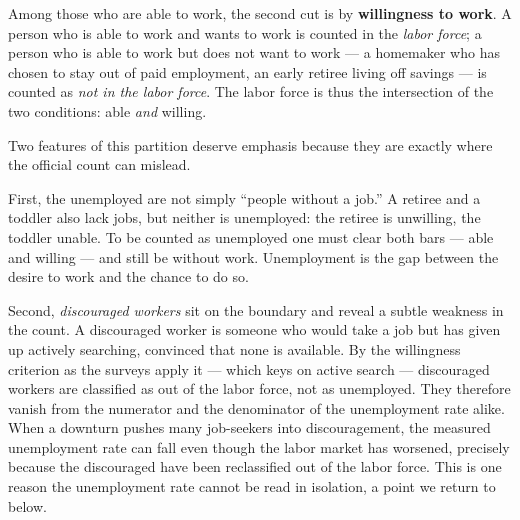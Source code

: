 Among those who are able to work, the second cut is by \textbf{willingness to work}. A person who is able to work and wants to work is counted in the \emph{labor force}; a person who is able to work but does not want to work --- a homemaker who has chosen to stay out of paid employment, an early retiree living off savings --- is counted as \emph{not in the labor force}. The labor force is thus the intersection of the two conditions: able \emph{and} willing.


Two features of this partition deserve emphasis because they are exactly where the official count can mislead.

First, the unemployed are not simply ``people without a job.'' A retiree and a toddler also lack jobs, but neither is unemployed: the retiree is unwilling, the toddler unable. To be counted as unemployed one must clear both bars --- able and willing --- and still be without work. Unemployment is the gap between the desire to work and the chance to do so.

Second, \emph{discouraged workers} sit on the boundary and reveal a subtle weakness in the count. A discouraged worker is someone who would take a job but has given up actively searching, convinced that none is available. By the willingness criterion as the surveys apply it --- which keys on active search --- discouraged workers are classified as out of the labor force, not as unemployed. They therefore vanish from the numerator and the denominator of the unemployment rate alike. When a downturn pushes many job-seekers into discouragement, the measured unemployment rate can fall even though the labor market has worsened, precisely because the discouraged have been reclassified out of the labor force. This is one reason the unemployment rate cannot be read in isolation, a point we return to below.

